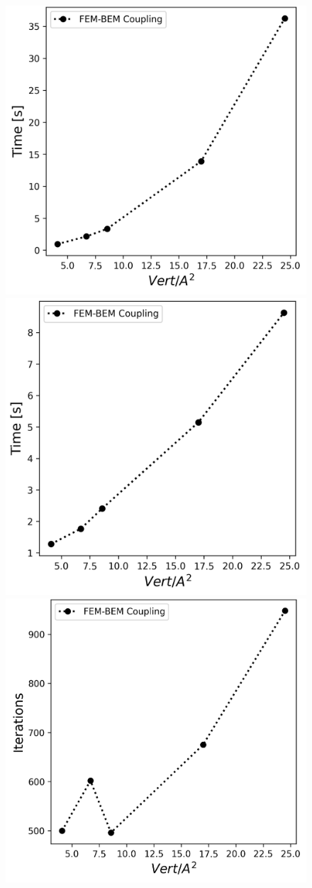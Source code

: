 
\begin{figure}
\centering
\includegraphics[width=0.45\linewidth]{DolfinX_Arginine2_varying_coeff_time.png}
\includegraphics[width=0.45\linewidth]{DolfinX_Arginine2_varying_coeff_set_time.png}
\includegraphics[width=0.45\linewidth]{DolfinX_Arginine2_varying_coeff_iter.png}

\end{figure}
